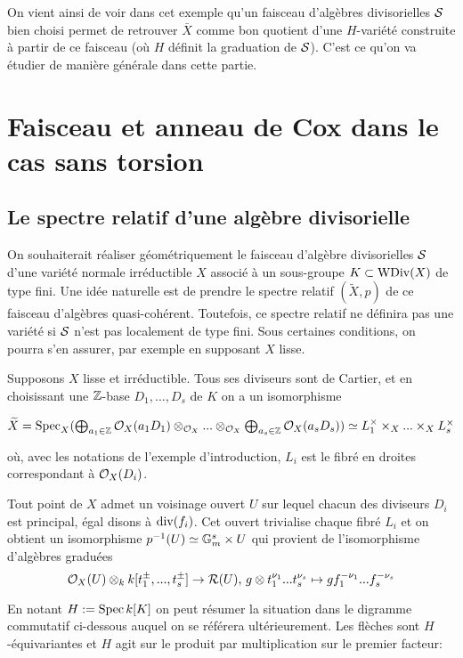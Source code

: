 On vient ainsi de voir dans cet exemple qu'un faisceau d'algèbres divisorielles $\mathcal{S}$ bien choisi permet de retrouver $\bar{X}$ comme bon quotient d'une $H$-variété construite à partir de ce faisceau (où $H$ définit la graduation de $\mathcal{S}$). C'est ce qu'on va étudier de manière générale dans cette partie.

\section{Faisceau et anneau de Cox dans le cas sans torsion}

\subsection{Le spectre relatif d'une algèbre divisorielle}


On souhaiterait réaliser géométriquement le faisceau d'algèbre divisorielles $\mathcal{S}$ d'une variété normale irréductible $X$ associé à un sous-groupe $K\subset \operatorname{WDiv}(X)$ de type fini. Une idée naturelle est de prendre le spectre relatif $(\widetilde{X}, p)$ de ce faisceau d'algèbres quasi-cohérent. Toutefois, ce spectre relatif ne définira pas une variété si $\mathcal{S}$ n'est pas localement de type fini. Sous certaines conditions, on pourra s'en assurer, par exemple en supposant $X$ lisse.

\begin{rem}\label{lisseGoodQuotient}
Supposons $X$ lisse et irréductible. Tous ses diviseurs sont de Cartier, et en choisissant une $\mathbb{Z}$-base $D_1,...,D_s$ de $K$ on a un isomorphisme
\begin{center}
$\widetilde{X}=\operatorname{Spec}_X(\bigoplus_{a_1\in\mathbb{Z}}\mathcal{O}_X(a_1D_1)\otimes_{\mathcal{O}_X}...\otimes_{\mathcal{O}_X}\bigoplus_{a_s\in\mathbb{Z}}\mathcal{O}_X(a_sD_s))\simeq L_1^\times\times_X...\times_X L_s^\times$
\end{center}
où, avec les notations de l'exemple d'introduction, $L_i$ est le fibré en droites correspondant à $\mathcal{O}_X(D_i)$. 

Tout point de $X$ admet un voisinage ouvert $U$ sur lequel chacun des diviseurs $D_i$ est principal, égal disons à $\operatorname{div}(f_i)$. Cet ouvert trivialise chaque fibré $L_i$ et on obtient un isomorphisme $p^{-1}(U)\simeq \mathbb{G}_m^s\times U$ qui provient de l'isomorphisme d'algèbres graduées
\begin{equation} \label{eq:1}
\mathcal{O}_X(U)\otimes_k k[t_1^{\pm},...,t_s^{\pm}] \rightarrow \mathcal{R}(U),\, g\otimes t_1^{\nu_1}...t_s^{\nu_s}\mapsto gf_1^{-\nu_1}...f_s^{-\nu_s}
\end{equation}

En notant $H:=\operatorname{Spec} k[K]$ on peut résumer la situation dans le digramme commutatif ci-dessous auquel on se référera ultérieurement. Les flèches sont $H$-équivariantes et $H$ agit sur le produit par multiplication sur le premier facteur:
\begin{center}
\end{center}
\end{rem}



